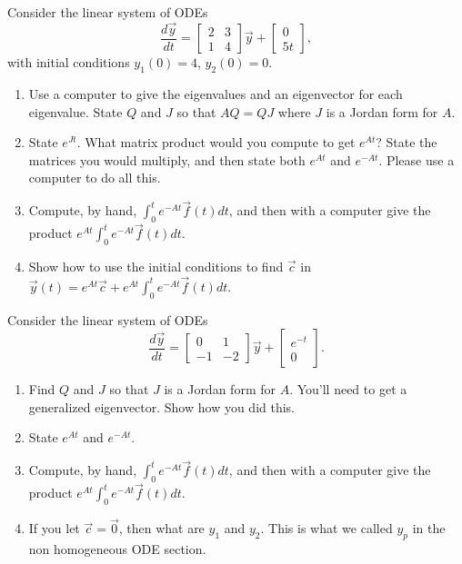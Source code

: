 \begin{problem} 
Consider the linear system of ODEs
$$
\frac{d\vec y}{dt}
=
\begin{bmatrix}
 2&3\\1&4
\end{bmatrix}
\vec y +
\begin{bmatrix}
 0\\5t
\end{bmatrix}
,$$
with initial conditions
$y_1(0)=4$, $y_2(0)=0$.
\begin{enumerate}
 \item Use a computer to give the eigenvalues and an eigenvector for each eigenvalue.  State $Q$ and $J$ so that $AQ=QJ$ where $J$ is a Jordan form for $A$. 
 \item State $e^{Jt}$. What matrix product would you compute to get $e^{At}$? State the matrices you would multiply, and then state both $e^{At}$ and $e^{-At}$. Please use a computer to do all this.
 \item Compute, by hand, $\int_0^t e^{-At}\vec f(t) dt$, and then with a computer give the product $e^{At}\int_0^t e^{-At}\vec f(t) dt$. 
 \item Show how to use the initial conditions to find $\vec c$ in $\vec y(t) = e^{At}\vec c + e^{At}\int_0^t e^{-At}\vec f(t) dt.$
\end{enumerate}
\end{problem}

\begin{problem}
Consider the linear system of ODEs
$$
\frac{d\vec y}{dt}
=
\begin{bmatrix}
 0&1\\-1&-2
\end{bmatrix}
\vec y +
\begin{bmatrix}
 e^{-t}\\0
\end{bmatrix}
.$$
\begin{enumerate}
 \item Find $Q$ and $J$ so that $J$ is a Jordan form for $A$.  You'll need to get a generalized eigenvector.  Show how you did this. 
 \item State $e^{At}$ and $e^{-At}$.
 \item Compute, by hand, $\int_0^t e^{-At}\vec f(t) dt$, and then with a computer give the product $e^{At}\int_0^t e^{-At}\vec f(t) dt$. 
 \item If you let $\vec c=\vec 0$, then what are $y_1$ and $y_2$.  This is what we called $y_p$ in the non homogeneous ODE section. 
\end{enumerate}
\end{problem}

